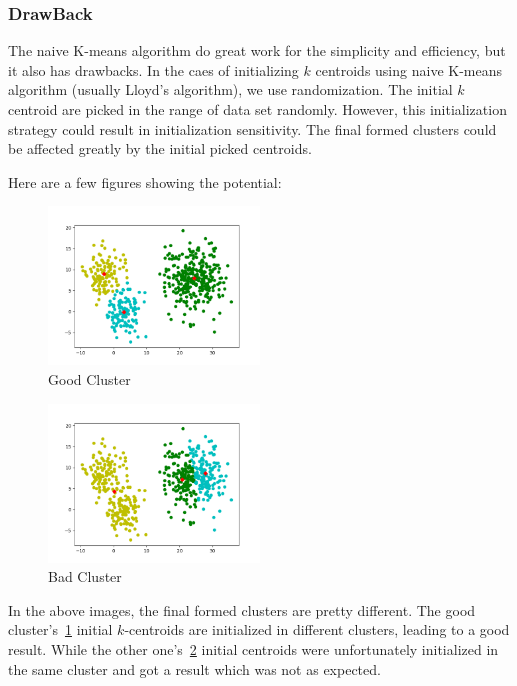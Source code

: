 \documentclass[11pt]{article}
\begin{document}
  \subsubsection{DrawBack}
  The naive K-means algorithm do great work for the simplicity and efficiency, but it also has drawbacks. In the caes of initializing $k$ centroids using naive K-means algorithm (usually Lloyd's algorithm), we use randomization.
  The initial $k$ centroid are picked in the range of data set randomly. However, this initialization strategy could result in initialization sensitivity. The final formed clusters could be affected greatly by the initial picked centroids.
  \par Here are a few figures showing the potential:
\begin{figure}[H] %
  \centering %
  \includegraphics[width=0.5\textwidth]{goodCluster.png} %
  \caption{Good Cluster} %
  \label{Fig.GoodCluster} %
\end{figure}
\begin{figure}[H] %
  \centering %
  \includegraphics[width=0.5\textwidth]{badCluster.png} %
  \caption{Bad Cluster} %
  \label{Fig.BadCluster} %
\end{figure}
\par In the above images, the final formed clusters are pretty different. The good cluster's~\ref{Fig.GoodCluster} initial $k$-centroids are initialized in different clusters, leading to a good result. While the other one's~\ref{Fig.BadCluster} initial centroids were unfortunately initialized in the same cluster and got a result which was not as expected.
\end{document}
